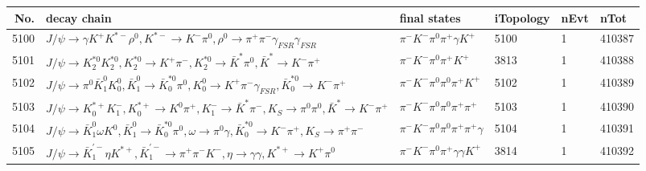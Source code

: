 \begin{table}[htbp] 
\begin{center}
\begin{small}
\begin{tabular}{rlllll}\hline\hline
 No. & decay chain & final states &  iTopology & nEvt & nTot \\\hline
5100&$J/\psi       \rightarrow \gamma       K^{+}          K^{*-}         \rho^{0}      , K^{*-}          \rightarrow K^{-}          \pi^{0}        , \rho^{0}       \rightarrow \pi^{+}        \pi^{-}        \gamma_{FSR} \gamma_{FSR} $&$\pi^{-}        K^{-}          \pi^{0}        \pi^{+}        \gamma       K^{+}          $& 5100&    1&410387\\
5101&$J/\psi       \rightarrow K_2^{*0}       K_2^{*0}       , K_2^{*0}        \rightarrow K^{+}          \pi^{-}        , K_2^{*0}        \rightarrow \bar{K}^{*}   \pi^{0}        , \bar{K}^{*}    \rightarrow K^{-}          \pi^{+}        $&$\pi^{-}        K^{-}          \pi^{0}        \pi^{+}        K^{+}          $& 3813&    1&410388\\
5102&$J/\psi       \rightarrow \pi^{0}        \bar{K}_1^{0} K_0^{0}        , \bar{K}_1^{0}  \rightarrow \bar{K}_0^{*0}\pi^{0}        , K_0^{0}         \rightarrow K^{+}          \pi^{-}        \gamma_{FSR} , \bar{K}_0^{*0} \rightarrow K^{-}          \pi^{+}        $&$\pi^{-}        K^{-}          \pi^{0}        \pi^{0}        \pi^{+}        K^{+}          $& 5102&    1&410389\\
5103&$J/\psi       \rightarrow K_{0}^{*+}     K_{1}^{-}      , K_{0}^{*+}      \rightarrow K^{0}          \pi^{+}        , K_{1}^{-}       \rightarrow \bar{K}^{*}   \pi^{-}        , K_{S}           \rightarrow \pi^{0}        \pi^{0}        , \bar{K}^{*}    \rightarrow K^{-}          \pi^{+}        $&$\pi^{-}        K^{-}          \pi^{0}        \pi^{0}        \pi^{+}        \pi^{+}        $& 5103&    1&410390\\
5104&$J/\psi       \rightarrow \bar{K}_1^{0} \omega         K^{0}          , \bar{K}_1^{0}  \rightarrow \bar{K}_0^{*0}\pi^{0}        , \omega          \rightarrow \pi^{0}        \gamma       , \bar{K}_0^{*0} \rightarrow K^{-}          \pi^{+}        , K_{S}           \rightarrow \pi^{+}        \pi^{-}        $&$\pi^{-}        K^{-}          \pi^{0}        \pi^{0}        \pi^{+}        \pi^{+}        \gamma       $& 5104&    1&410391\\
5105&$J/\psi       \rightarrow \bar{K}_1^{'-}\eta          K^{*+}         , \bar{K}_1^{'-} \rightarrow \pi^{+}        \pi^{-}        K^{-}          , \eta           \rightarrow \gamma       \gamma       , K^{*+}          \rightarrow K^{+}          \pi^{0}        $&$\pi^{-}        K^{-}          \pi^{0}        \pi^{+}        \gamma       \gamma       K^{+}          $& 3814&    1&410392\\

\end{tabular}
\end{small}
\end{center}
\end{table}

